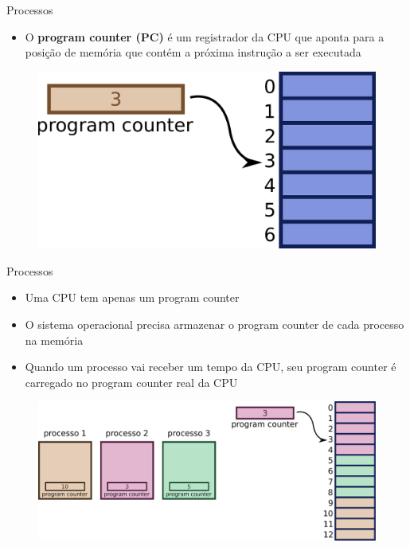 \documentclass{beamer}
\begin{document}
\begin{frame}{Processos}
	\begin{itemize}
		\item O \textbf{program counter (PC)} é um registrador da CPU que aponta para a posição de memória que contém a próxima instrução a ser executada
	\end{itemize}
	\begin{figure}
		\includegraphics[width=0.5\paperwidth]{resources/pc}
	\end{figure}
\end{frame}
\begin{frame}{Processos}
	\begin{itemize}
		\item Uma CPU tem apenas um program counter
		\item O sistema operacional precisa armazenar o program counter de cada processo na memória
		\item Quando um processo vai receber um tempo da CPU, seu program counter é carregado no program counter real da CPU
	\end{itemize}
	\begin{figure}
		\includegraphics[width=0.8\paperwidth]{resources/pc2}
	\end{figure}
\end{frame}
\end{document}
